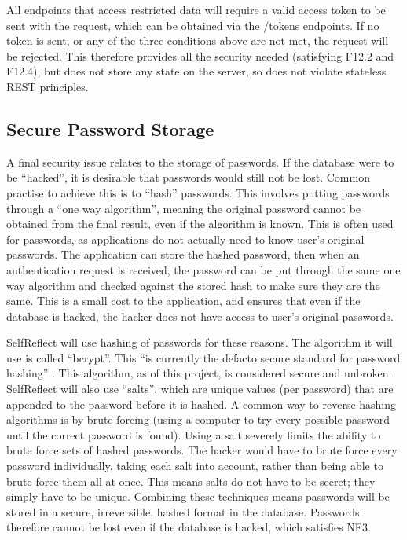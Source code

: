 \documentclass[11pt,openright,a4paper]{report}
\begin{document}
All endpoints that access restricted data will require a valid access token to be sent with the request, which can be obtained via the /tokens endpoints. If no token is sent, or any of the three conditions above are not met, the request will be rejected. This therefore provides all the security needed (satisfying F12.2 and F12.4), but does not store any state on the server, so does not violate stateless REST principles.

\subsection{Secure Password Storage} \label{subsec:secpass}
A final security issue relates to the storage of passwords. If the database were to be \enquote{hacked}, it is desirable that passwords would still not be lost. Common practise to achieve this is to \enquote{hash} passwords. This involves putting passwords through a \enquote{one way algorithm}, meaning the original password cannot be obtained from the final result, even if the algorithm is known. This is often used for passwords, as applications do not actually need to know user's original passwords. The application can store the hashed password, then when an authentication request is received, the password can be put through the same one way algorithm and checked against the stored hash to make sure they are the same. This is a small cost to the application, and ensures that even if the database is hacked, the hacker does not have access to user's original passwords.

SelfReflect will use hashing of passwords for these reasons. The algorithm it will use is called \enquote{bcrypt}. This \enquote{is currently the defacto secure standard for password hashing} \parencite{bcryptblog}. This algorithm, as of this project, is considered secure and unbroken. SelfReflect will also use \enquote{salts}, which are unique values (per password) that are appended to the password before it is hashed. A common way to reverse hashing algorithms is by brute forcing (using a computer to try every possible password until the correct password is found). Using a salt severely limits the ability to brute force sets of hashed passwords. The hacker would have to brute force every password individually, taking each salt into account, rather than being able to brute force them all at once. This means salts do not have to be secret; they simply have to be unique. Combining these techniques means passwords will be stored in a secure, irreversible, hashed format in the database. Passwords therefore cannot be lost even if the database is hacked, which satisfies NF3.
\end{document}
